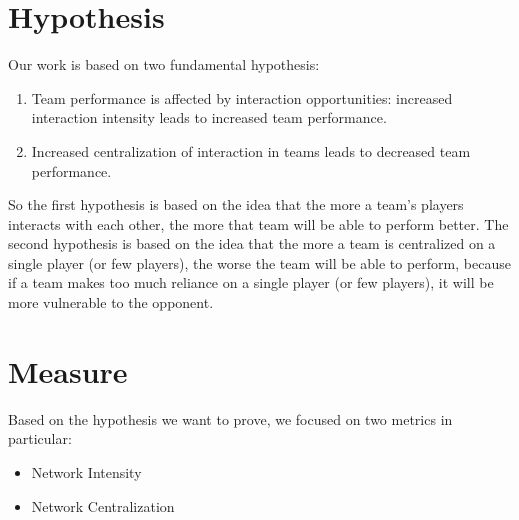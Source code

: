 \documentclass[12pt, a4paper]{article}
\begin{document}


\section{Hypothesis}
Our work is based on two fundamental hypothesis:
\begin{enumerate}
        \item Team performance is affected by interaction opportunities: increased interaction intensity leads to increased team performance.
        \item Increased centralization of interaction in teams leads to decreased team performance.
\end{enumerate}
So the first hypothesis is based on the idea that the more a team's players interacts with each other, the more that team will be able to perform better. The second hypothesis is based on the idea that the more a team is centralized on a single player (or few players), the worse the team will be able to perform, because if a team makes too much reliance on a single player (or few players), it will be more vulnerable to the opponent. 
\section{Measure}
\label{measures}
Based on the hypothesis we want to prove, we focused on two metrics in particular:
\begin{itemize}
        \item Network Intensity
        \item Network Centralization
\end{itemize}
\end{document}
